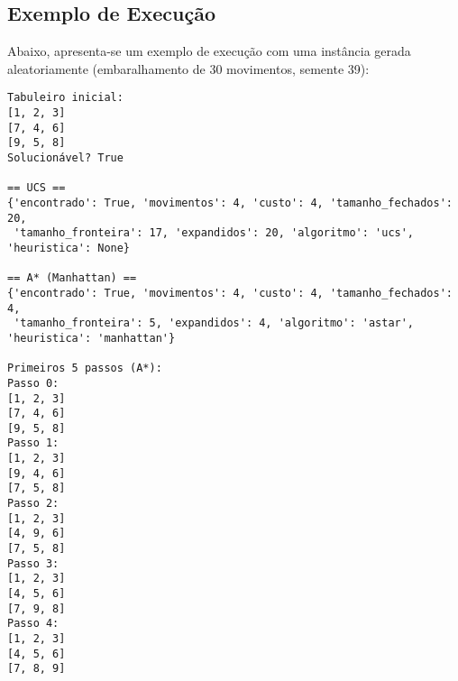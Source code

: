 \subsection{Exemplo de Execução}  
Abaixo, apresenta-se um exemplo de execução com uma instância gerada aleatoriamente (embaralhamento de 30 movimentos, semente 39):  

\begin{verbatim}  
Tabuleiro inicial:  
[1, 2, 3]  
[7, 4, 6]  
[9, 5, 8]  
Solucionável? True  

== UCS ==  
{'encontrado': True, 'movimentos': 4, 'custo': 4, 'tamanho_fechados': 20,  
 'tamanho_fronteira': 17, 'expandidos': 20, 'algoritmo': 'ucs', 'heuristica': None}  

== A* (Manhattan) ==  
{'encontrado': True, 'movimentos': 4, 'custo': 4, 'tamanho_fechados': 4,  
 'tamanho_fronteira': 5, 'expandidos': 4, 'algoritmo': 'astar', 'heuristica': 'manhattan'}  

Primeiros 5 passos (A*):  
Passo 0:  
[1, 2, 3]  
[7, 4, 6]  
[9, 5, 8]  
Passo 1:  
[1, 2, 3]  
[9, 4, 6]  
[7, 5, 8]  
Passo 2:  
[1, 2, 3]  
[4, 9, 6]  
[7, 5, 8]  
Passo 3:  
[1, 2, 3]  
[4, 5, 6]  
[7, 9, 8]  
Passo 4:  
[1, 2, 3]  
[4, 5, 6]  
[7, 8, 9]  
\end{verbatim}  

